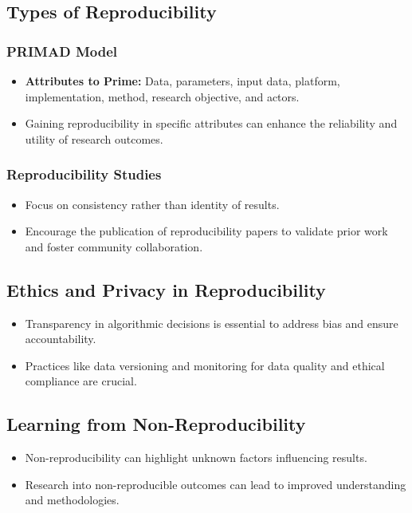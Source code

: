 \subsection{Types of Reproducibility}
\subsubsection{PRIMAD Model}
\begin{itemize}
    \item \textbf{Attributes to Prime:} Data, parameters, input data, platform, implementation, method, research objective, and actors.
    \item Gaining reproducibility in specific attributes can enhance the reliability and utility of research outcomes.
\end{itemize}

\subsubsection{Reproducibility Studies}
\begin{itemize}
    \item Focus on consistency rather than identity of results.
    \item Encourage the publication of reproducibility papers to validate prior work and foster community collaboration.
\end{itemize}

\subsection{Ethics and Privacy in Reproducibility}
\begin{itemize}
    \item Transparency in algorithmic decisions is essential to address bias and ensure accountability.
    \item Practices like data versioning and monitoring for data quality and ethical compliance are crucial.
\end{itemize}

\subsection{Learning from Non-Reproducibility}
\begin{itemize}
    \item Non-reproducibility can highlight unknown factors influencing results.
    \item Research into non-reproducible outcomes can lead to improved understanding and methodologies.
\end{itemize}
